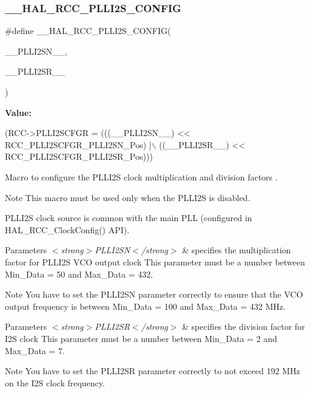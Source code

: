 \subsubsection{\texorpdfstring{\+\_\+\+\_\+\+H\+A\+L\+\_\+\+R\+C\+C\+\_\+\+P\+L\+L\+I2\+S\+\_\+\+C\+O\+N\+F\+IG}{\_\_HAL\_RCC\_PLLI2S\_CONFIG}}
{\footnotesize\ttfamily \#define \+\_\+\+\_\+\+H\+A\+L\+\_\+\+R\+C\+C\+\_\+\+P\+L\+L\+I2\+S\+\_\+\+C\+O\+N\+F\+IG(\begin{DoxyParamCaption}\item[{}]{\+\_\+\+\_\+\+P\+L\+L\+I2\+S\+N\+\_\+\+\_\+,  }\item[{}]{\+\_\+\+\_\+\+P\+L\+L\+I2\+S\+R\+\_\+\+\_\+ }\end{DoxyParamCaption})}

{\bfseries Value\+:}
\begin{DoxyCode}
(RCC->PLLI2SCFGR = (((\_\_PLLI2SN\_\_) << RCC\_PLLI2SCFGR\_PLLI2SN\_Pos)  |\(\backslash\)
                               ((\_\_PLLI2SR\_\_) << RCC\_PLLI2SCFGR\_PLLI2SR\_Pos)))
\end{DoxyCode}


Macro to configure the P\+L\+L\+I2S clock multiplication and division factors . 

\begin{DoxyNote}{Note}
This macro must be used only when the P\+L\+L\+I2S is disabled. 

P\+L\+L\+I2S clock source is common with the main P\+LL (configured in H\+A\+L\+\_\+\+R\+C\+C\+\_\+\+Clock\+Config() A\+PI). 
\end{DoxyNote}

\begin{DoxyParams}{Parameters}
{\em $<$strong$>$\+P\+L\+L\+I2\+S\+N$<$/strong$>$} & specifies the multiplication factor for P\+L\+L\+I2S V\+CO output clock This parameter must be a number between Min\+\_\+\+Data = 50 and Max\+\_\+\+Data = 432. \\
\hline
\end{DoxyParams}
\begin{DoxyNote}{Note}
You have to set the P\+L\+L\+I2\+SN parameter correctly to ensure that the V\+CO output frequency is between Min\+\_\+\+Data = 100 and Max\+\_\+\+Data = 432 M\+Hz.
\end{DoxyNote}

\begin{DoxyParams}{Parameters}
{\em $<$strong$>$\+P\+L\+L\+I2\+S\+R$<$/strong$>$} & specifies the division factor for I2S clock This parameter must be a number between Min\+\_\+\+Data = 2 and Max\+\_\+\+Data = 7. \\
\hline
\end{DoxyParams}
\begin{DoxyNote}{Note}
You have to set the P\+L\+L\+I2\+SR parameter correctly to not exceed 192 M\+Hz on the I2S clock frequency. 
\end{DoxyNote}
